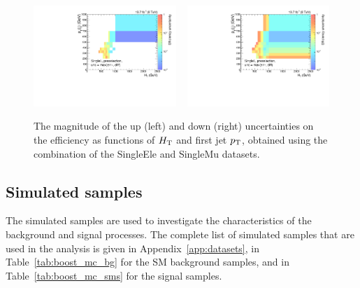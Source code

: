 \begin{figure}[htpb]
\centering
\includegraphics[width=0.48\textwidth]
{figures/razor_trigger/h_HT_j1pt_0_pre_errdiff_up_ph_l_forThesis}
~
\includegraphics[width=0.48\textwidth]
{figures/razor_trigger/h_HT_j1pt_0_pre_errdiff_low_ph_l_forThesis}
\caption{The magnitude of the up (left) and down (right) uncertainties on the efficiency as 
functions of $H_{\mathrm{T}}$ and first jet $p_{\mathrm{T}}$, obtained using the combination of the SingleEle and SingleMu 
datasets. 
\label{fig:boost_trigger_efficiency_unc}}
\end{figure}



\subsection{Simulated samples \label{sec:boost_mc_samples}}

The simulated samples are used to investigate the characteristics of the background and signal
processes.  The complete list of simulated samples that are used in the analysis is given in
Appendix~\ref{app:datasets}, in Table~\ref{tab:boost_mc_bg} for the SM background samples, and in
Table~\ref{tab:boost_mc_sms} for the signal samples. 

